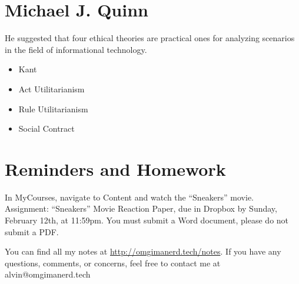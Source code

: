 \documentclass[letterpaper, 12pt]{article}
\begin{document}
\section*{Michael J. Quinn}
He suggested that four ethical theories are practical ones for analyzing
scenarios in the field of informational technology.
\begin{itemize}
  \item Kant
  \item Act Utilitarianism
  \item Rule Utilitarianism
  \item Social Contract
\end{itemize}

\section*{Reminders and Homework}
In MyCourses, navigate to Content and watch the ``Sneakers'' movie. \\
Assignment: ``Sneakers'' Movie Reaction Paper, due in Dropbox by Sunday,
February 12th, at 11:59pm.
You must submit a Word document, please do not submit a PDF.

\begin{center}
  You can find all my notes at \url{http://omgimanerd.tech/notes}. If you have
  any questions, comments, or concerns, feel free to contact me at
  alvin@omgimanerd.tech
\end{center}
\end{document}
